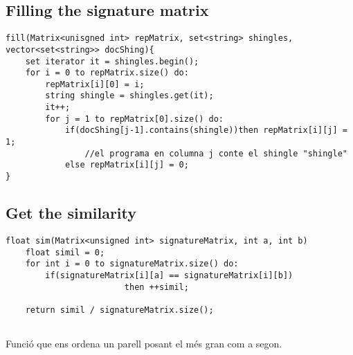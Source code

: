 \documentclass[12pt]{article}
\begin{document}
\subsection{Filling the signature matrix}
\begin{lstlisting}
fill(Matrix<unisgned int> repMatrix, set<string> shingles, 
vector<set<string>> docShing){
	set iterator it = shingles.begin();	
	for i = 0 to repMatrix.size() do:
		repMatrix[i][0] = i;
		string shingle = shingles.get(it);
		it++; 
		for j = 1 to repMatrix[0].size() do:
			if(docShing[j-1].contains(shingle))then repMatrix[i][j] = 1;
				//el programa en columna j conte el shingle "shingle"
			else repMatrix[i][j] = 0;
}
\end{lstlisting}
\medskip

\subsection{Get the similarity}
\begin{lstlisting}
float sim(Matrix<unsigned int> signatureMatrix, int a, int b)
    float simil = 0;
    for int i = 0 to signatureMatrix.size() do:
        if(signatureMatrix[i][a] == signatureMatrix[i][b])
						then ++simil;
    
    return simil / signatureMatrix.size();


\end{lstlisting}

\begin{large}Funció que ens ordena un parell posant el més gran com a segon.
\end{large}
\end{document}
